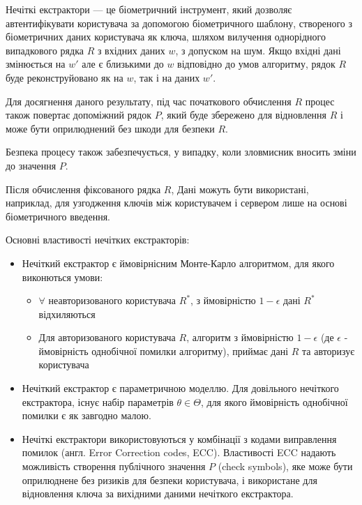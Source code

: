 \documentclass[11pt]{article}
\providecommand{\tightlist}{%
      \setlength{\itemsep}{0pt}\setlength{\parskip}{0pt}}
\begin{document}
Нечіткі екстрактори --- це біометричний інструмент, який дозволяє
автентифікувати користувача за допомогою біометричного шаблону,
створеного з біометричних даних користувача як ключа, шляхом вилучення
однорідного випадкового рядка \(R\) з вхідних даних \(w\), з допуском на
шум. Якщо вхідні дані змінюється на \(w'\) але є близькими до \(w\)
відповідно до умов алгоритму, рядок \(R\) буде реконструйовано як на
\(w\), так і на даних \(w'\).

Для досягнення даного результату, під час початкового обчислення \(R\)
процес також повертає допоміжний рядок \(P\), який буде збережено для
відновлення \(R\) і може бути оприлюднений без шкоди для безпеки \(R\).

Безпека процесу також забезпечується, у випадку, коли зловмисник вносить
зміни до значення \(P\).

Після обчислення фіксованого рядка \(R\), Дані можуть бути використані,
наприклад, для узгодження ключів між користувачем і сервером лише на
основі біометричного введення.

    Основні властивості нечітких екстракторів:

\begin{itemize}
\item
  Нечіткий екстрактор є ймовірнісним Монте-Карло алгоритмом, для якого
  виконються умови:

  \begin{itemize}
  \tightlist
  \item
    \(\forall\) неавторизованого користувача \(R^*\), з ймовірністю
    \(1-\epsilon\) дані \(R^*\) відхиляються
  \item
    Для авторизованого користувача \(R\), алгоритм з ймовірністю
    \(1-\epsilon\) (де \(\epsilon\) - ймовірність однобічної помилки
    алгоритму), приймає дані \(R\) та авторизує користувача
  \end{itemize}
\item
  Нечіткий екстрактор є параметричною моделлю. Для довільного нечіткого
  екстрактора, існує набір параметрів \(\theta \in \Theta\), для якого
  ймовірність однобічної помилки є як завгодно малою.
\item
  Нечіткі екстрактори використовуються у комбінації з кодами виправлення
  помилок (англ. Error Correction codes, ECC). Властивості ECC надають
  можливість створення публічного значення \(P\) (check symbols), яке
  може бути оприлюднене без ризиків для безпеки користувача, і
  використане для відновлення ключа за вихідними даними нечіткого
  екстрактора.
\end{itemize}
\end{document}

